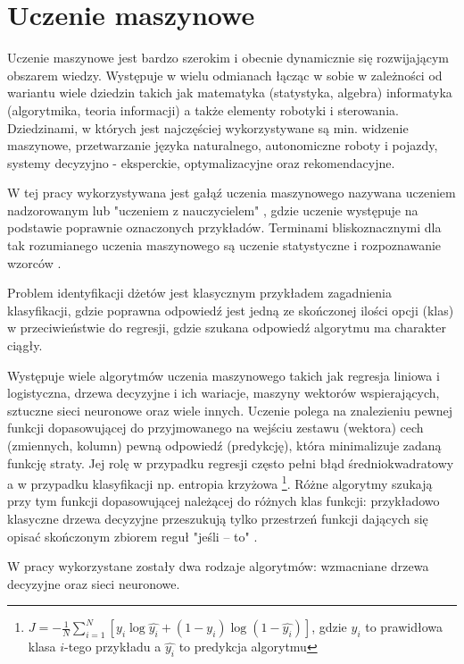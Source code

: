\clearpage
\section{Uczenie maszynowe}
\label{sec:ml}

Uczenie maszynowe jest bardzo szerokim i obecnie dynamicznie się rozwijającym obszarem wiedzy. Występuje w wielu odmianach łącząc w sobie w zależności od wariantu wiele dziedzin takich jak matematyka (statystyka, algebra) informatyka (algorytmika, teoria informacji) a także elementy robotyki i sterowania. 
Dziedzinami, w których jest najczęściej wykorzystywane są min. widzenie maszynowe, przetwarzanie języka naturalnego, autonomiczne roboty i pojazdy, systemy decyzyjno - eksperckie, optymalizacyjne oraz rekomendacyjne.

W tej pracy wykorzystywana jest gałąź uczenia maszynowego nazywana uczeniem nadzorowanym lub "uczeniem z nauczycielem" , gdzie uczenie występuje na podstawie poprawnie oznaczonych przykładów. Terminami bliskoznacznymi dla tak rozumianego uczenia maszynowego są uczenie statystyczne  i rozpoznawanie wzorców .

Problem identyfikacji dżetów jest klasycznym przykładem zagadnienia klasyfikacji, gdzie poprawna odpowiedź jest jedną ze skończonej ilości opcji (klas) w przeciwieństwie do regresji, gdzie szukana odpowiedź algorytmu ma charakter ciągły. 

Występuje wiele algorytmów uczenia maszynowego takich jak regresja liniowa i logistyczna, drzewa decyzyjne i ich wariacje, maszyny wektorów wspierających, sztuczne sieci neuronowe oraz wiele innych. Uczenie polega na znalezieniu pewnej funkcji dopasowującej do przyjmowanego na wejściu zestawu (wektora) cech (zmiennych, kolumn) pewną odpowiedź (predykcję), która minimalizuje zadaną funkcję straty. Jej rolę w przypadku regresji często pełni błąd średniokwadratowy a w przypadku klasyfikacji np. entropia krzyżowa  \footnote{$J = -\frac{1}{N} \sum\limits_{i=1}^N \left[y_i \log\hat{y_i} + (1-y_i)\log(1-\hat{y_i}) \right]$, gdzie $y_i$ to prawidłowa klasa $i$-tego przykładu a $\hat{y_i}$ to predykcja algorytmu}. 
Różne algorytmy szukają przy tym funkcji dopasowującej należącej do różnych klas funkcji: przykładowo klasyczne drzewa decyzyjne przeszukują tylko przestrzeń funkcji dających się opisać skończonym zbiorem reguł "jeśli -- to" .

W pracy wykorzystane zostały dwa rodzaje algorytmów: wzmacniane drzewa decyzyjne oraz sieci neuronowe.
\FloatBarrier



